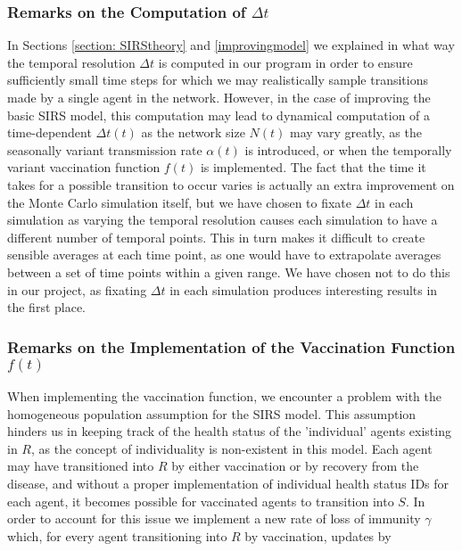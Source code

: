 \subsubsection{Remarks on the Computation of $\Delta t$}
In Sections \ref{section: SIRStheory} and \ref{improvingmodel} we explained in what way the temporal resolution $\Delta t$ is computed in our program in order to ensure sufficiently small time steps for which we may realistically sample transitions made by a single agent in the network. However, in the case of improving the basic SIRS model, this computation may lead to dynamical computation of a time-dependent $\Delta t (t)$ as the network size $N(t)$ may vary greatly, as the seasonally variant transmission rate $\alpha(t)$ is introduced, or when the temporally variant vaccination function $f(t)$ is implemented. The fact that the time it takes for a possible transition to occur varies is actually an extra improvement on the Monte Carlo simulation itself, but we have chosen to fixate $\Delta t$ in each simulation as varying the temporal resolution causes each simulation to have a different number of temporal points. This in turn makes it difficult to create sensible averages at each time point, as one would have to extrapolate averages between a set of time points within a given range. We have chosen not to do this in our project, as fixating $\Delta t$ in each simulation produces interesting results in the first place.\\

\subsubsection{Remarks on the Implementation of the Vaccination Function $f(t)$}
\label{section:vacfunc}
When implementing the vaccination function, we encounter a problem with the homogeneous population assumption for the SIRS model. This assumption hinders us in keeping track of the health status of the 'individual' agents existing in $R$, as the concept of individuality is non-existent in this model. Each agent may have transitioned into $R$ by either vaccination or by recovery from the disease, and without a proper implementation of individual health status IDs for each agent, it becomes possible for vaccinated agents to transition into $S$. In order to account for this issue we implement a new rate of loss of immunity $\gamma$ which, for every agent transitioning into $R$ by vaccination, updates by

